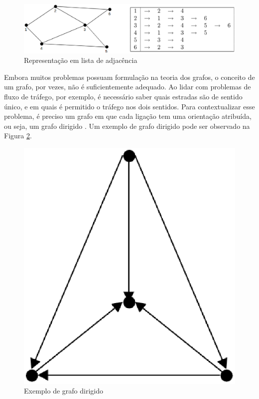 \begin{figure}[!h]
	\centering
	\includegraphics[scale=0.3]{figuras/capitulo2/lista_adjacencia.eps}
	\caption[Representação em lista de adjacência]{Representação em lista de adjacência \cite{Costa:2011}}
	\label{lista_adjacencia}
\end{figure}

Embora muitos problemas possuam formulação na teoria dos grafos, o conceito de um grafo, por vezes, não é suficientemente adequado. Ao lidar com problemas de fluxo de tráfego, por exemplo, é necessário saber quais estradas são de sentido único, e em quais é permitido o tráfego nos dois sentidos. Para contextualizar esse problema, é preciso um grafo em que cada ligação tem uma orientação atribuída, ou seja, um grafo dirigido \cite{Bondy:2007}. Um exemplo de grafo dirigido pode ser observado na Figura \ref{dirigido}.

\begin{figure}[!h]
	\centering
	\includegraphics[scale=0.15]{figuras/capitulo2/dirigido.eps}
	\caption[Exemplo de grafo dirigido]{Exemplo de grafo dirigido \cite{Bondy:2007}}
	\label{dirigido}
\end{figure}

